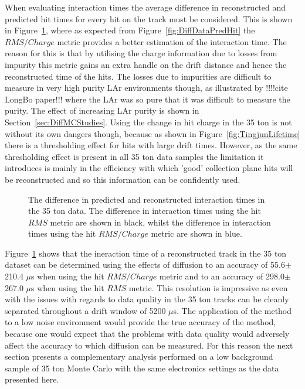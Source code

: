 When evaluating interaction times the average difference in reconstructed and predicted hit times for every hit on the track must be considered. This is shown in Figure~\ref{fig:DiffDataAvDiff}, where as expected from Figure~\ref{fig:DiffDataPredHit} the $RMS/Charge$ metric provides a better estimation of the interaction time. The reason for this is that by utilising the charge information due to losses from impurity this metric gains an extra handle on the drift distance and hence the reconstructed time of the hits. The losses due to impurities are difficult to measure in very high purity LAr environments though, as illustrated by !!!!cite LongBo paper!!! where the LAr was so pure that it was difficult to measure the purity. The effect of increasing LAr purity is shown in Section~\ref{sec:DiffMCStudies}. Using the change in hit charge in the 35 ton is not without its own dangers though, because as shown in Figure~\ref{fig:TingjunLifetime} there is a thresholding effect for hits with large drift times. However, as the same thresholding effect is present in all 35 ton data samples the limitation it introduces is mainly in the efficiency with which 'good' collection plane hits will be reconstructed and so this information can be confidently used. \\

\begin{figure}[h!]
  \centering
  \caption[The difference in predicted and reconstructed interaction times in the 35 ton data]
          {The difference in predicted and reconstructed interaction times in the 35 ton data. The difference in interaction times using the hit $RMS$ metric are shown in black, whilst the difference in interaction times using the hit $RMS/Charge$ metric are shown in blue.}
          \label{fig:DiffDataAvDiff}
\end{figure}

Figure~\ref{fig:DiffDataAvDiff} shows that the ineraction time of a reconstructed track in the 35 ton dataset can be determined using the effects of diffusion to an accuracy of 55.6$\pm$210.4 $\mu$s when using the hit $RMS/Charge$ metric and to an accuracy of 298.0$\pm$267.0 $\mu$s when using the hit $RMS$ metric. This resolution is impressive as even with the issues with regards to data quality in the 35 ton tracks can be cleanly separated throughout a drift window of 5200 $\mu$s. The application of the method to a low noise environment would provide the true accuracy of the method, because one would expect that the problems with data quality would adversely affect the accuracy to which diffusion can be measured. For this reason the next section presents a complementary analysis performed on a low background sample of 35 ton Monte Carlo with the same electronics settings as the data presented here. 

